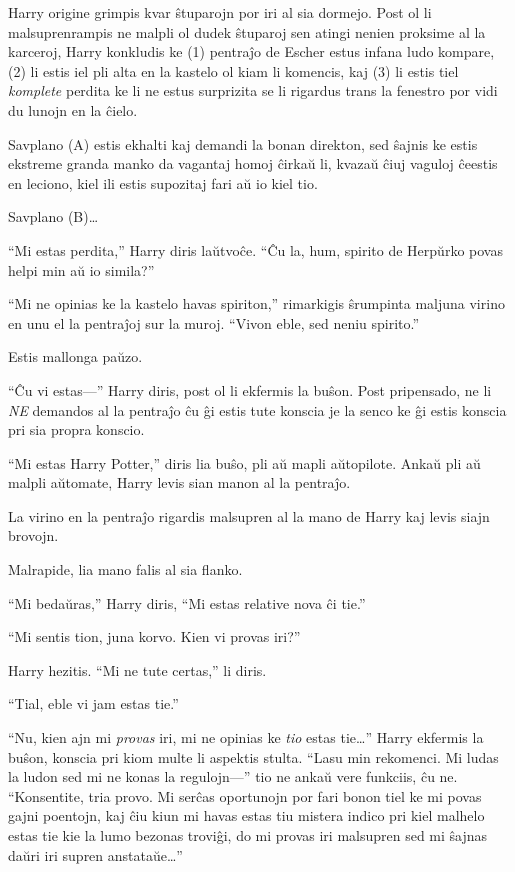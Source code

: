 Harry origine grimpis kvar ŝtuparojn por iri al sia dormejo. Post ol li
malsuprenrampis ne malpli ol dudek ŝtuparoj sen atingi nenien proksime al la
karceroj, Harry konkludis ke (1) pentraĵo de Escher estus infana ludo kompare,
(2) li estis iel pli alta en la kastelo ol kiam li komencis, kaj (3) li estis
tiel \emph{komplete} perdita ke li ne estus surprizita se li rigardus trans la
fenestro por vidi du lunojn en la ĉielo.

Savplano (A) estis ekhalti kaj demandi la bonan direkton, sed ŝajnis ke estis
ekstreme granda manko da vagantaj homoj ĉirkaŭ li, kvazaŭ ĉiuj vaguloj ĉeestis
en leciono, kiel ili estis supozitaj fari aŭ io kiel tio.

Savplano (B)\ldots

``Mi estas perdita,'' Harry diris laŭtvoĉe. ``Ĉu la, hum, spirito de
Herpŭrko povas helpi min aŭ io simila?''

``Mi ne opinias ke la kastelo havas spiriton,'' rimarkigis ŝrumpinta maljuna
virino en unu el la pentraĵoj sur la muroj. ``Vivon eble, sed neniu spirito.''

Estis mallonga paŭzo.

``Ĉu vi estas—'' Harry diris, post ol li ekfermis la buŝon. Post pripensado, ne
li \emph{NE} demandos al la pentraĵo ĉu ĝi estis tute konscia je la senco ke ĝi
estis konscia pri sia propra konscio.

``Mi estas Harry Potter,'' diris lia buŝo, pli aŭ mapli aŭtopilote. Ankaŭ pli aŭ
malpli aŭtomate, Harry levis sian manon al la pentraĵo.

La virino en la pentraĵo rigardis malsupren al la mano de Harry kaj levis siajn
brovojn.

Malrapide, lia mano falis al sia flanko.

``Mi bedaŭras,'' Harry diris, ``Mi estas relative nova ĉi tie.''

``Mi sentis tion, juna korvo. Kien vi provas iri?''

Harry hezitis. ``Mi ne tute certas,'' li diris.

``Tial, eble vi jam estas tie.''

``Nu, kien ajn mi \emph{provas} iri, mi ne opinias ke \emph{tio} estas tie\ldots''
Harry ekfermis la buŝon, konscia pri kiom multe li aspektis stulta. ``Lasu min
rekomenci. Mi ludas la ludon sed mi ne konas la regulojn—'' tio ne ankaŭ vere
funkciis, ĉu ne. ``Konsentite, tria provo. Mi serĉas oportunojn por fari bonon
tiel ke mi povas gajni poentojn, kaj ĉiu kiun mi havas estas tiu mistera
indico pri kiel malhelo estas tie kie la lumo bezonas troviĝi, do mi provas iri
malsupren sed mi ŝajnas daŭri iri supren anstataŭe\ldots''

